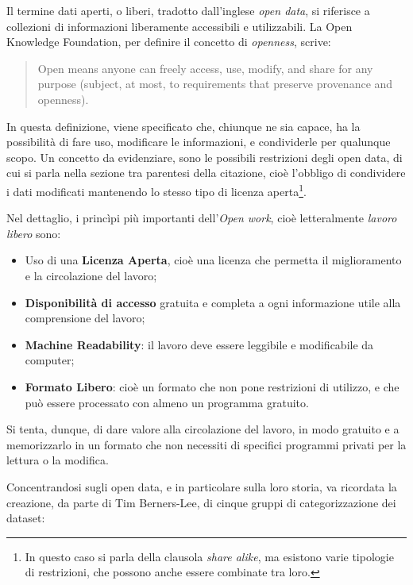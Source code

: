 \documentclass[a4paper]{report}
\newcommand{\quotestyle}[1]{\textit{#1}}
\begin{document}
Il termine dati aperti, o liberi, tradotto dall'inglese \quotestyle{open data}, 
si riferisce a collezioni di informazioni liberamente accessibili e 
utilizzabili. 
La Open Knowledge Foundation, per definire il concetto di \quotestyle{openness}, 
scrive: 

\begin{quotation}
    Open means anyone can freely access, use, modify, and share for any purpose 
    (subject, at most, to requirements that preserve provenance and openness). \cite{OPENDEFINITION:1}
\end{quotation}

In questa definizione, viene specificato che, chiunque ne sia capace, ha la possibilità di 
fare uso, modificare le informazioni, e condividerle per qualunque scopo. 
Un concetto da evidenziare, sono le possibili restrizioni degli open data, 
di cui si parla nella sezione tra parentesi della citazione, 
cioè l'obbligo di condividere i dati modificati 
mantenendo lo stesso tipo di licenza 
aperta\footnote{In questo caso si parla della clausola \quotestyle{share alike}, ma 
esistono varie tipologie di restrizioni, che possono anche essere combinate tra loro.}. 

Nel dettaglio, i princìpi più importanti dell'\quotestyle{Open work}, 
cioè letteralmente \quotestyle{lavoro libero} sono: 

\begin{itemize}
    \item Uso di una \textbf{Licenza Aperta}, cioè una licenza che permetta 
    il miglioramento e la circolazione del lavoro;
    \item \textbf{Disponibilità di accesso} gratuita e completa a ogni informazione utile 
    alla comprensione del lavoro; 
    \item \textbf{Machine Readability}: il lavoro deve essere leggibile e modificabile da computer; 
    \item \textbf{Formato Libero}: cioè un formato che non pone restrizioni di utilizzo, 
    e che può essere processato con almeno un programma gratuito.
\end{itemize}

Si tenta, dunque, di dare valore alla circolazione del lavoro, in modo gratuito e
a memorizzarlo in un formato che non necessiti di specifici programmi privati 
per la lettura o la modifica.


Concentrandosi sugli open data, e in particolare sulla loro storia, 
va ricordata la creazione, da parte di 
Tim Berners-Lee, di cinque gruppi di categorizzazione dei dataset: 
\end{document}

